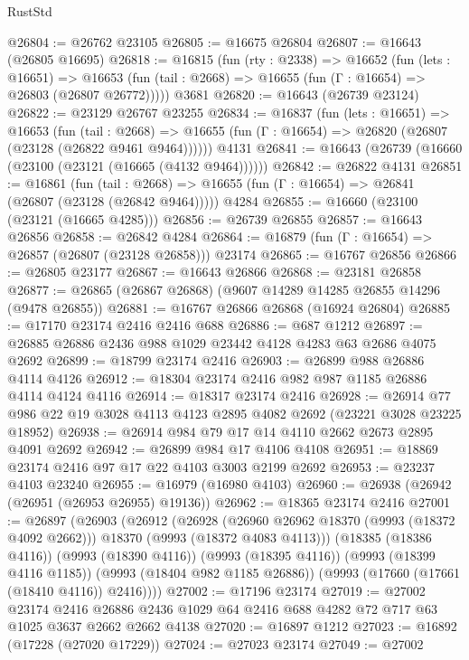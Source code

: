 \begin{lexlean}{RustStd}
\begin{coremodule}
@26804 := @26762 @23105
@26805 := @16675 @26804
@26807 := @16643 (@26805 @16695)
@26818 := @16815
    (fun (rty : @2338) =>
    @16652
      (fun (lets : @16651) =>
      @16653 (fun (tail : @2668) => @16655 (fun (Γ : @16654) => @26803 (@26807 @26772)))))
    @3681
@26820 := @16643 (@26739 @23124)
@26822 := @23129 @26767 @23255
@26834 := @16837
    (fun (lets : @16651) =>
    @16653
      (fun (tail : @2668) =>
      @16655 (fun (Γ : @16654) => @26820 (@26807 (@23128 (@26822 @9461 @9464))))))
    @4131
@26841 := @16643 (@26739 (@16660 (@23100 (@23121 (@16665 (@4132 @9464))))))
@26842 := @26822 @4131
@26851 := @16861
    (fun (tail : @2668) => @16655 (fun (Γ : @16654) => @26841 (@26807 (@23128 (@26842 @9464)))))
    @4284
@26855 := @16660 (@23100 (@23121 (@16665 @4285)))
@26856 := @26739 @26855
@26857 := @16643 @26856
@26858 := @26842 @4284
@26864 := @16879 (fun (Γ : @16654) => @26857 (@26807 (@23128 @26858))) @23174
@26865 := @16767 @26856
@26866 := @26805 @23177
@26867 := @16643 @26866
@26868 := @23181 @26858
@26877 := @26865 (@26867 @26868) (@9607 @14289 @14285 @26855 @14296 (@9478 @26855))
@26881 := @16767 @26866 @26868 (@16924 @26804)
@26885 := @17170 @23174 @2416 @2416 @688
@26886 := @687 @1212
@26897 := @26885 @26886 @2436 @988 @1029 @23442 @4128 @4283 @63 @2686 @4075 @2692
@26899 := @18799 @23174 @2416
@26903 := @26899 @988 @26886 @4114 @4126
@26912 := @18304 @23174 @2416 @982 @987 @1185 @26886 @4114 @4124 @4116
@26914 := @18317 @23174 @2416
@26928 := @26914 @77 @986 @22 @19 @3028 @4113 @4123 @2895 @4082 @2692 (@23221 @3028 @23225 @18952)
@26938 := @26914 @984 @79 @17 @14 @4110 @2662 @2673 @2895 @4091 @2692
@26942 := @26899 @984 @17 @4106 @4108
@26951 := @18869 @23174 @2416 @97 @17 @22 @4103 @3003 @2199 @2692
@26953 := @23237 @4103 @23240
@26955 := @16979 (@16980 @4103)
@26960 := @26938 (@26942 (@26951 (@26953 @26955) @19136))
@26962 := @18365 @23174 @2416
@27001 := @26897
    (@26903
      (@26912
        (@26928
          (@26960 @26962 @18370 (@9993 (@18372 @4092 @2662)))
          @18370
          (@9993 (@18372 @4083 @4113)))
        (@18385 (@18386 @4116))
        (@9993 (@18390 @4116))
        (@9993 (@18395 @4116))
        (@9993 (@18399 @4116 @1185))
        (@9993 (@18404 @982 @1185 @26886))
        (@9993 (@17660 (@17661 (@18410 @4116)) @2416))))
@27002 := @17196 @23174
@27019 := @27002
    @23174
    @2416
    @26886
    @2436
    @1029
    @64
    @2416
    @688
    @4282
    @72
    @717
    @63
    @1025
    @3637
    @2662
    @2662
    @4138
@27020 := @16897 @1212
@27023 := @16892 (@17228 (@27020 @17229))
@27024 := @27023 @23174
@27049 := @27002

\end{coremodule}
\end{lexlean}
